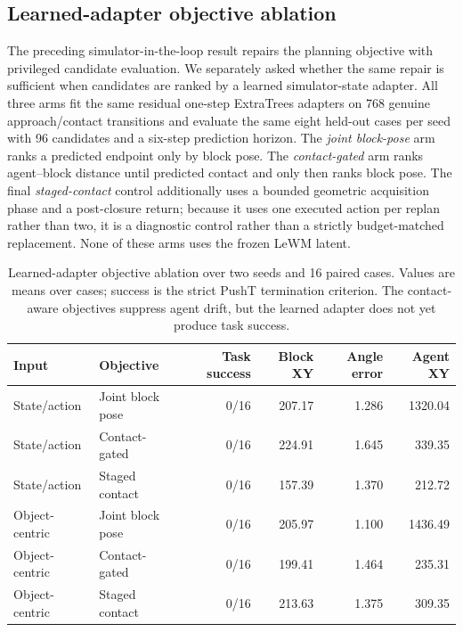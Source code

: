 \documentclass{article}
\begin{document}
\subsection{Learned-adapter objective ablation}
\label{sec:supp-learned-adapter-objective}

The preceding simulator-in-the-loop result repairs the planning objective with
privileged candidate evaluation.  We separately asked whether the same repair
is sufficient when candidates are ranked by a learned simulator-state adapter.
All three arms fit the same residual one-step ExtraTrees adapters on 768
genuine approach/contact transitions and evaluate the same eight held-out
cases per seed with 96 candidates and a six-step prediction horizon.  The
\emph{joint block-pose} arm ranks a predicted endpoint only by block pose.
The \emph{contact-gated} arm ranks agent--block distance until predicted
contact and only then ranks block pose.  The final \emph{staged-contact}
control additionally uses a bounded geometric acquisition phase and a
post-closure return; because it uses one executed action per replan rather
than two, it is a diagnostic control rather than a strictly budget-matched
replacement.  None of these arms uses the frozen LeWM latent.

\begin{table}[H]
\centering
\scriptsize
\setlength{\tabcolsep}{4pt}
\caption{Learned-adapter objective ablation over two seeds and 16 paired
cases.  Values are means over cases; success is the strict PushT termination
criterion.  The contact-aware objectives suppress agent drift, but the
learned adapter does not yet produce task success.}
\label{tab:supp-learned-adapter-objective}
\begin{tabular}{llrrrr}
\toprule
Input & Objective & Task success & Block XY & Angle error & Agent XY \\
\midrule
State/action & Joint block pose & 0/16 & 207.17 & 1.286 & 1320.04 \\
State/action & Contact-gated & 0/16 & 224.91 & 1.645 & 339.35 \\
State/action & Staged contact & 0/16 & 157.39 & 1.370 & 212.72 \\
Object-centric & Joint block pose & 0/16 & 205.97 & 1.100 & 1436.49 \\
Object-centric & Contact-gated & 0/16 & 199.41 & 1.464 & 235.31 \\
Object-centric & Staged contact & 0/16 & 213.63 & 1.375 & 309.35 \\
\bottomrule
\end{tabular}
\end{table}
\end{document}
